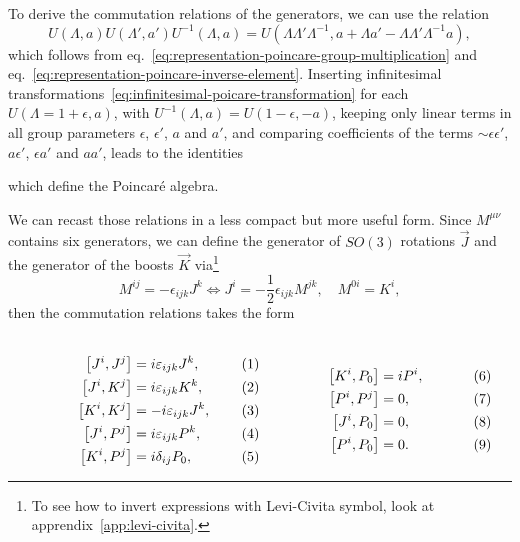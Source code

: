To derive the commutation relations of the generators, we can use the relation
\begin{equation}
    U(\Lambda, a) U(\Lambda',a') U^{-1}(\Lambda,a) = U(\Lambda \Lambda' \Lambda^{-1}, a + \Lambda a' - \Lambda \Lambda' \Lambda^{-1}a) ,
\end{equation}
which follows from eq.~\eqref{eq:representation-poincare-group-multiplication} and eq.~\eqref{eq:representation-poincare-inverse-element}. Inserting infinitesimal transformations~\eqref{eq:infinitesimal-poicare-transformation} for each $U(\Lambda = 1 + \epsilon, a)$, with $U^{-1} (\Lambda,a) = U(1-\epsilon,-a)$, keeping only linear terms in all group parameters $\epsilon$, $\epsilon'$, $a$ and $a'$, and comparing coefficients of the terms $\sim \epsilon\epsilon'$, $a\epsilon'$, $\epsilon a'$ and $aa'$, leads to the identities

which define the Poincaré algebra.

We can recast those relations in a less compact but more useful form. Since $M^{\mu\nu}$ contains six generators, we can define the generator of $SO(3)$ rotations $\vec{J}$ and the generator of the boosts $\vec{K}$ via\footnote{To see how to invert expressions with Levi-Civita symbol, look at apprendix~\ref{app:levi-civita}.}
\begin{equation}\label{eq:poincare-boosts-rotations}
    M^{ij} = - \epsilon_{ijk} J^k \iff J^i =- \frac{1}{2} \epsilon_{ijk} M^{jk}, \quad M^{0i} = K^i, 
\end{equation}
then the commutation relations takes the form

\begin{subequations}
\label{eq:poincare-commutation-boosts-rotations}
\noindent\centering
    \begin{minipage}{0.48\textwidth}
        \begin{align}
        \comm{J^i}{J^j} &= i \epsilon_{ijk} J^k, \\
        \comm{J^i}{K^j} &= i \epsilon_{ijk} K^k ,\\
        \comm{K^i}{K^j} &= -i \epsilon_{ijk} J^k, \\
        \comm{J^i}{P^j} &= i \epsilon_{ijk} P^k ,\\
        \comm{K^i}{P^j} &= i \delta_{ij} P_0,
        \end{align}
    \end{minipage}
    \hfill
    \begin{minipage}{0.48\textwidth}
    \label{eq:bell_states}
        \begin{align}
        \comm{K^i}{P_0} &= i P^i ,\\
        \comm{P^i}{P^j} &= 0, \\
        \comm{J^i}{P_0} &= 0, \\
        \comm{P^i}{P_0} &= 0 .
        \end{align}
    \end{minipage}\bigskip
    \end{subequations}

